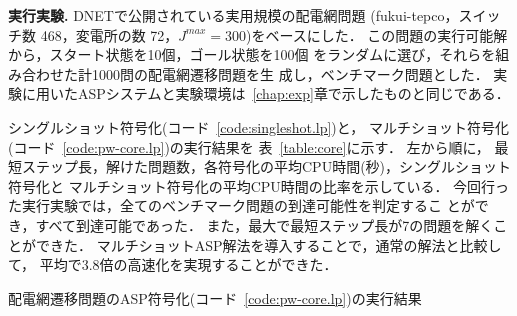\textbf{実行実験.}
%
DNETで公開されている実用規模の配電網問題
({\sf fukui-tepco}，スイッチ数 468，変電所の数 72，$J^{max}=300$)をベースにした．
この問題の実行可能解から，スタート状態を10個，ゴール状態を100個
をランダムに選び，それらを組み合わせた計1000問の配電網遷移問題を生
成し，ベンチマーク問題とした．
実験に用いたASPシステムと実験環境は~\ref{chap:exp}章で示したものと同じである．

シングルショット符号化(コード~\ref{code:singleshot.lp})と，
マルチショット符号化(コード~\ref{code:pw-core.lp})の実行結果を
表~\ref{table:core}に示す．
左から順に，
最短ステップ長，解けた問題数，各符号化の平均CPU時間(秒)，シングルショット符号化と
マルチショット符号化の平均CPU時間の比率を示している．
今回行った実行実験では，全てのベンチマーク問題の到達可能性を判定するこ
とができ，すべて到達可能であった．
また，最大で最短ステップ長が7の問題を解くことができた．
マルチショットASP解法を導入することで，通常の解法と比較して，
平均で3.8倍の高速化を実現することができた．

\begin{table*}[t]
  \centering
  \caption{配電網遷移問題のASP符号化(コード~\ref{code:pw-core.lp})の実行結果}
  \label{table:core}
  
\end{table*}



